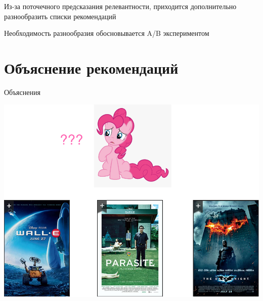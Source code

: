 \documentclass[11pt,aspectratio=169]{beamer}
\begin{document}
\begin{frame}{}

\begin{tcolorbox}[colback=info!5,colframe=info!80,title=]
Из-за поточечного предсказания релевантности, приходится дополнительно разнообразить списки рекомендаций
\end{tcolorbox}

\begin{tcolorbox}[colback=info!5,colframe=info!80,title=]
Необходимость разнообразия обосновывается A/B экспериментом
\end{tcolorbox}

\end{frame}

\section{Объяснение рекомендаций}

\begin{frame}{Объяснения}

\begin{center}
\includegraphics[scale=0.22]{images/explainability-1.png}
\end{center}

\end{frame}
\end{document}
